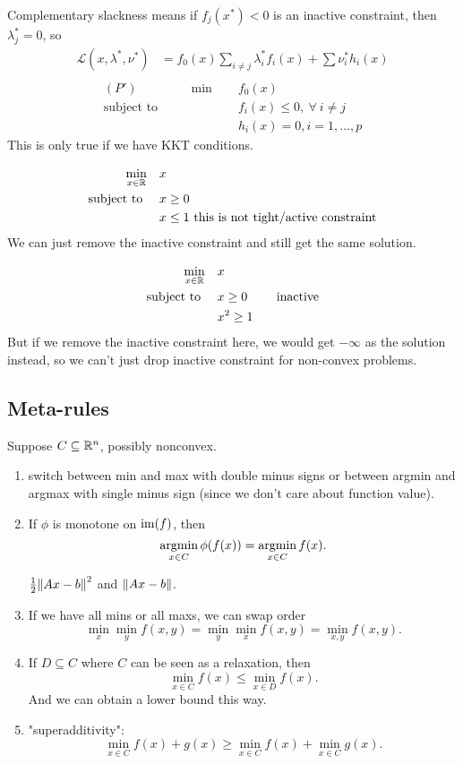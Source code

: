 \documentclass[class=article,crop=false]{standalone}
\begin{document}
\begin{remark}
	Complementary slackness means if $ f_j(x^* )<0$ is an inactive constraint, then $ \lambda_j^* =0$, so
	\begin{align*}
		\mathscr{L}(x,\lambda^* ,\nu^* ) &= f_0(x) \sum_{i\neq j} \lambda_i^* f_i(x) + \sum \nu_i^* h_i(x) \\
	\end{align*}
\begin{align*}
	(P') \qquad \qquad \min\quad &f_0(x) \\
\text{subject to } \quad &f_i(x) \leq 0, \ \forall \ i \neq j \\
&h_i(x) = 0 , i = 1,\ldots,p
\end{align*}
This is only true if we have KKT conditions.
\end{remark}
\begin{eg}[1]
\begin{align*}
\min_{x \in \mathbb{R}}\quad &x \\
\text{subject to } \quad &x\geq 0 \\
&x\leq 1 \text{ this is not tight/active constraint} 
\end{align*}
We can just remove the inactive constraint and still get the same solution.
\end{eg}
\begin{eg}[2]
\begin{align*}
\min_{x \in \mathbb{R}}\quad &x \\
\text{subject to } \quad &x\geq 0 \qquad \text{ inactive} \\
&x^2 \geq 1
\end{align*}
But if we remove the inactive constraint here, we would get $ -\infty$ as the solution instead, so we can't just drop inactive constraint for non-convex problems.
\end{eg}

\subsection{Meta-rules}
Suppose $ C \subseteq \mathbb{R}^{n}$, possibly nonconvex.
\begin{enumerate}[label=(\arabic*)]
	\item switch between min and max with double minus signs or between argmin and argmax with single minus sign (since we don't care about function value).
	\item If $ \phi$ is monotone on $ \operatorname{im}(f)$, then
		\[
			\operatorname*{argmin}_{x \in C} \phi(f(x)) = \operatorname*{argmin}_{x \in C} f(x)
		.\]
		\begin{eg}
		$ \frac{1}{2} {\left\lVert{ Ax-b}\right\rVert}^2 $ and $ {\left\lVert{ Ax-b}\right\rVert} $.
		\end{eg}
	\item If we have all mins or all maxs, we can swap order
		\[
			\min_x \min_y f(x,y) = \min_y \min_x f(x,y) = \min_{x,y} f(x,y)
		.\] 
	\item If $ D \subseteq C$ where $ C$ can be seen as a relaxation, then
		\[
			\min_{x \in C} f(x) \leq \min_{x \in D} f(x)
		.\]
		And we can obtain a lower bound this way.
	\item "superadditivity":
		\[
			\min_{x \in C} f(x)+g(x) \geq \min_{x \in C} f(x) + \min_{x \in C} g(x)
		.\] 
\end{enumerate}
\end{document}
